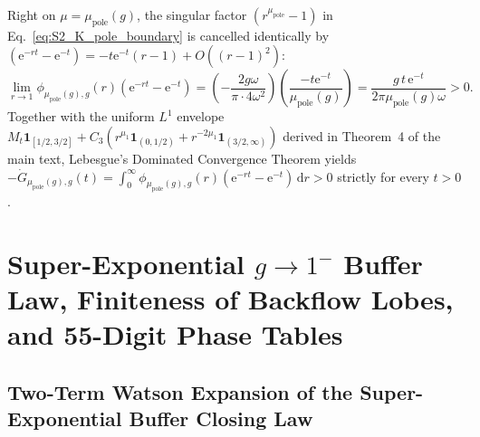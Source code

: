 \documentclass[onecolumn,10pt,notitlepage,amsmath,amssymb,floatfix]{revtex4-2}
\theoremstyle{plain}
\theoremstyle{definition}
\newcommand{\dd}{\mathrm{d}}
\newcommand{\ee}{\mathrm{e}}
\newcommand{\mupole}{\mu_{\mathrm{pole}}}
\begin{document}
Right on $\mu = \mupole(g)$, the singular factor $(r^{\mupole}-1)$ in Eq.~\eqref{eq:S2_K_pole_boundary} is cancelled identically by $(\ee^{-rt} - \ee^{-t}) = -t\ee^{-t}(r-1) + O((r-1)^2)$:
\begin{equation}
\label{eq:S2_removable_limit}
\lim_{r\to 1} \phi_{\mupole(g),g}(r)(\ee^{-rt} - \ee^{-t})
= \left(-\frac{2g\omega}{\pi\cdot 4\omega^2}\right)\left(\frac{-t\ee^{-t}}{\mupole(g)}\right)
= \frac{g\,t\,\ee^{-t}}{2\pi\mupole(g)\omega} > 0.
\end{equation}
Together with the uniform $L^1$ envelope $M_t \mathbf{1}_{[1/2,3/2]} + C_3(r^{\mu_1}\mathbf{1}_{(0,1/2)} + r^{-2\mu_1}\mathbf{1}_{(3/2,\infty)})$ derived in Theorem~4 of the main text, Lebesgue's Dominated Convergence Theorem yields $-\dot{G}_{\mupole(g),g}(t) = \int_0^\infty \phi_{\mupole(g),g}(r)(\ee^{-rt}-\ee^{-t})\,\dd r > 0$ strictly for every $t > 0$.

\section{Super-Exponential \texorpdfstring{$g \to 1^-$}{g -> 1-} Buffer Law, Finiteness of Backflow Lobes, and 55-Digit Phase Tables}
\label{sec:S3}

\subsection{Two-Term Watson Expansion of the Super-Exponential Buffer Closing Law}
\end{document}
